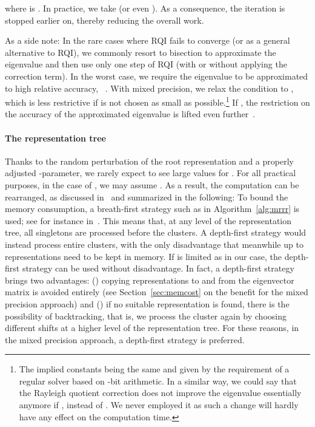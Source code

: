 \documentclass[final]{siamltex}
\begin{document}
where  is . In practice, we take  (or
even ). As a consequence, the iteration is stopped
earlier on, thereby reducing the overall work. 

As a side note: In the rare cases where RQI fails to converge (or as a general alternative to
RQI), we commonly resort to bisection to approximate the eigenvalue
 and then use only one step of RQI (with or without
applying the correction term). In the worst case, we require the eigenvalue to be
approximated to high relative accuracy, ~\cite{Dhillon:2004:Ortvecs}. With mixed precision, we 
relax the condition to , which is less
restrictive if  is not chosen as small as
possible.\footnote{The implied constants being the same and given by the
  requirement of a regular solver based on -bit arithmetic. In a similar way, we
  could say that the Rayleigh quotient correction does not
  improve the eigenvalue essentially anymore 
  if , instead of . We never employed it as such a
  change will hardly have any effect on the computation time.} If
, the restriction on the accuracy of the
approximated eigenvalue is lifted even further~\cite{Willems:Diss}. 

\paragraph{The representation tree} 
Thanks to the random
perturbation of the root representation and a properly adjusted
-parameter, we rarely expect to see large values for . For all
practical purposes, in the case of , we may assume . As a result,
the computation can be rearranged, as discussed
in~\cite{Willems:framework} and summarized in the following: To bound the memory
consumption, a breath-first strategy such as in Algorithm~\ref{alg:mrrr} is used; see for
instance in~\cite{DesignMRRR,mr3smp}. This means that, at
any level of the representation tree, all singletons are processed before the
clusters. A depth-first strategy would instead process entire clusters,
with the
only disadvantage that meanwhile up to  representations need to 
be kept in memory. If  is limited as in our case, the depth-first
strategy can be used without disadvantage. In fact, a depth-first strategy
brings two advantages: () 
copying representations to and from the eigenvector matrix is avoided entirely (see
Section~\ref{sec:memcost} on the benefit for the mixed precision approach) and () if no
suitable representation is found, there is the possibility of
backtracking, that is, we process the cluster again by choosing different
shifts at a higher level of the representation tree. For these reasons, in the mixed
precision approach, a depth-first strategy is preferred. 
\end{document}
